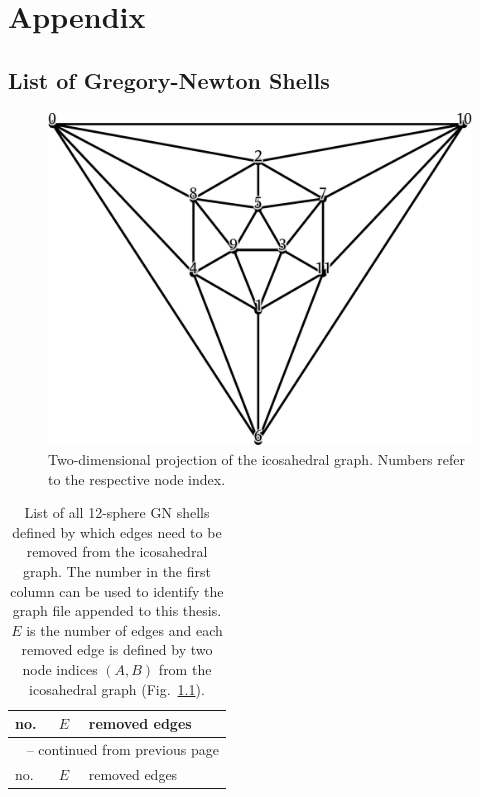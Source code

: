 
\part{Appendix}
\label{sec:appendix}

\begin{appendix}

\chapter{List of Gregory-Newton Shells}
\label{sec:listofgregorynewtonshells}

\begin{figure}[h]\centering
\includegraphics[width=.8\textwidth]{gregory-newton/ico.pdf}
    \caption{Two-dimensional projection of the icosahedral graph. Numbers refer
        to the respective node index.}
    \label{fig:icographappendix}
\end{figure}

\footnotesize{\begin{longtable}{lll}
    \caption{List of all 12-sphere \ac{GN} shells defined by which edges need
    to be removed from the icosahedral graph. The number in the first column
    can be used to identify the graph file appended to this thesis. $E$ is the
    number of edges and each removed edge is defined by two node indices
    $(A,B)$ from the icosahedral graph (Fig.~\ref{fig:icographappendix}).}
    \label{tab:icosubgraphs}\\

\toprule no.  & $E$  &  removed edges \\\midrule\endfirsthead

\multicolumn{3}{c}{\tablename~\thetable{} -- continued from previous page}\\
\toprule no.  & $E$  &  removed edges \\\midrule
\endhead


\end{longtable}}
\end{appendix}
